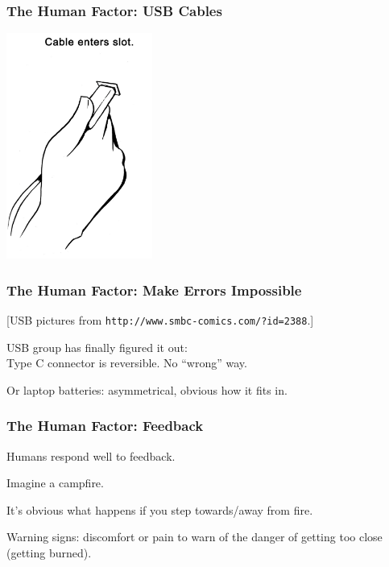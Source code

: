 \begin{frame}
\frametitle{The Human Factor: USB Cables}
\begin{changemargin}{1cm}

\vspace{-0.5em}
\begin{center}
	\includegraphics[height=20em]{images/usb5.png}\\
\end{center}

\end{changemargin}
\end{frame}


\begin{frame}
\frametitle{The Human Factor: Make Errors Impossible}
\begin{changemargin}{1cm}

[USB pictures from \texttt{http://www.smbc-comics.com/?id=2388}.]

USB group has finally figured it out:\\
\quad Type C connector is reversible. No ``wrong'' way.

Or laptop batteries: asymmetrical, obvious how it fits in.

\end{changemargin}
\end{frame}


\begin{frame}
\frametitle{The Human Factor: Feedback}
\begin{changemargin}{1cm}

Humans respond well to feedback.

Imagine a campfire. 

It's obvious what happens if you step towards/away from fire.

Warning signs: discomfort or pain to warn of the danger of getting too close (getting burned).

\end{changemargin}
\end{frame}

